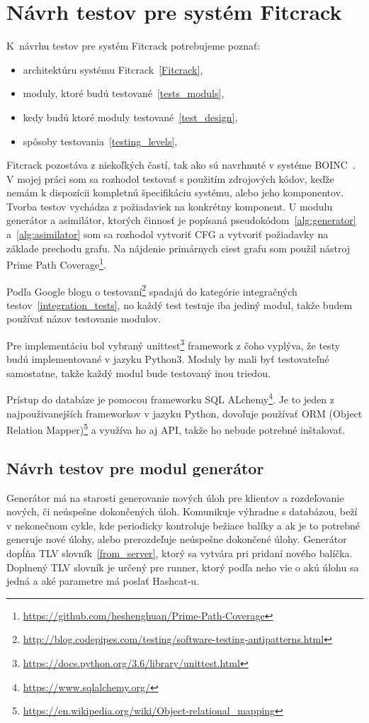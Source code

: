 \chapter{Návrh testov pre systém Fitcrack}
\label{navrh}
K~návrhu testov pre systém Fitcrack potrebujeme poznať:
\begin{itemize}
	\item architektúru systému Fitcrack~\ref{Fitcrack},
	\item moduly, ktoré budú testované~\ref{tests_moduls},
	\item kedy budú ktoré moduly testované~\ref{test_design},
	\item spôsoby testovania~\ref{testing_levels},
\end{itemize}
Fitcrack pozostáva z niekoľkých častí, tak ako sú navrhnuté v systéme BOINC~\cite{boincintro}.
V mojej práci som sa rozhodol testovať s použitím zdrojových kódov, keďže nemám k dispozícii kompletnú špecifikáciu systému, alebo jeho komponentov. 
Tvorba testov vychádza z požiadaviek na konkrétny komponent.
U modulu generátor a asimilátor, ktorých činnosť je popísaná pseudokódom~\ref{alg:generator} a~\ref{alg:asimilator} som sa rozhodol vytvoriť CFG a vytvoriť požiadavky na základe prechodu grafu. 
Na nájdenie primárnych ciest grafu som použil nástroj Prime Path Coverage\footnote{\url{https://github.com/heshenghuan/Prime-Path-Coverage}}.

Podľa Google blogu o testovaní\footnote{\url{http://blog.codepipes.com/testing/software-testing-antipatterns.html}} spadajú do kategórie integračných testov~\ref{integration_tests}, no každý test testuje iba jediný modul, takže budem používať názov testovanie modulov.

Pre implementáciu bol vybraný unittest\footnote{\url{https://docs.python.org/3.6/library/unittest.html}} framework z čoho vyplýva, že testy budú implementované v jazyku Python3.
Moduly by mali byť testovateľné samostatne, takže každý modul bude testovaný inou triedou.

Prístup do databáze je pomocou frameworku SQL ALchemy\footnote{\url{https://www.sqlalchemy.org/}}.
Je to jeden z najpouživanejších frameworkov v jazyku Python, dovoľuje používať ORM (Object Relation Mapper)\footnote{\url{https://en.wikipedia.org/wiki/Object-relational_mapping}} a využíva ho aj API, takže ho nebude potrebné inštalovať.


\section{Návrh testov pre modul generátor}
\label{navrh_gen}
Generátor má na starosti generovanie nových úloh pre klientov a rozdeľovanie nových, či neúspešne dokončených úloh. 
Komunikuje výhradne s databázou, beží v nekonečnom cykle, kde periodicky kontroluje bežiace balíky a ak je to potrebné generuje nové úlohy, alebo prerozdeľuje neúspešne dokončené úlohy.
Generátor dopĺňa TLV slovník~\ref{from_server}, ktorý sa vytvára pri pridaní nového balíčka.
Doplnený TLV slovník je určený pre runner, ktorý podľa neho vie o akú úlohu sa jedná a aké parametre má poslať Hashcat-u.

